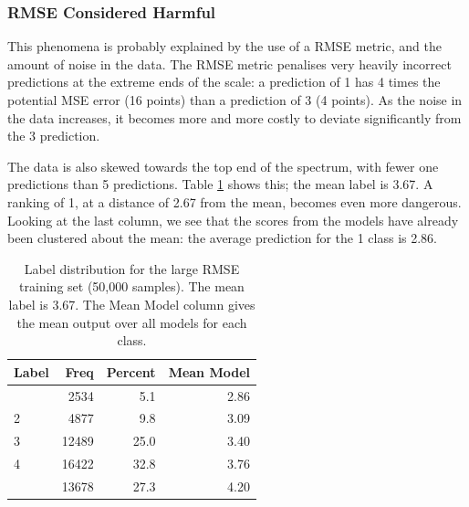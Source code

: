 \documentclass{article}
\begin{document}
\subsubsection{RMSE Considered Harmful}

This phenomena is probably explained by the use of a RMSE metric, and the amount of noise in the data.  The RMSE metric penalises very heavily incorrect predictions at the extreme ends of the scale: a prediction of 1 has 4 times the potential MSE error (16 points) than a prediction of 3 (4 points).  As the noise in the data increases, it becomes more and more costly to deviate significantly from the 3 prediction.

The data is also skewed towards the top end of the spectrum, with fewer one predictions than 5 predictions.  Table \ref{table:label-frequency} shows this; the mean label is 3.67.  A ranking of 1, at a distance of 2.67 from the mean, becomes even more dangerous.  Looking at the last column, we see that the scores from the models have already been clustered about the mean: the average prediction for the 1 class is 2.86.

\begin{table}[t]
\caption{Label distribution for the large RMSE training set (50,000 samples).  The mean label is 3.67.  The Mean Model column gives the mean output over all models for each class.}
\label{table:label-frequency}
\vskip 0.15in
\begin{center}
\begin{small}
\begin{sc}
\begin{tabular}{lrrr}
\hline
\abovespace\belowspace
Label & Freq & Percent & Mean Model\\
\hline
\abovespace
1 &  2534 &  5.1 & 2.86 \\
2 &  4877 &  9.8 & 3.09 \\
3 & 12489 & 25.0 & 3.40 \\
4 & 16422 & 32.8 & 3.76 \\
\belowspace
5 & 13678 & 27.3 & 4.20\\
\hline
\end{tabular}
\end{sc}
\end{small}
\end{center}
\vskip -0.1in
\end{table}
\end{document}
